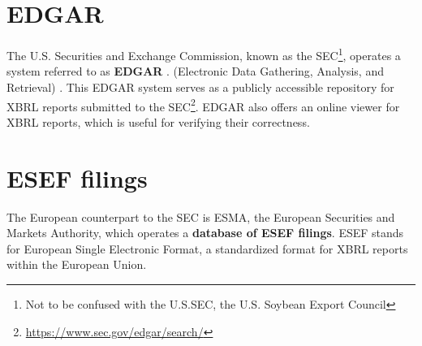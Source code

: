 \section{EDGAR}
\label{sec:edgar}
The U.S. Securities and Exchange Commission, known as the SEC\footnote{Not to be confused with the U.S.SEC, the U.S. Soybean Export Council},
operates a system referred to as 
\textcolor{tropicalrainforest}{\textbf{EDGAR}} \cite{sec_edgar}. 
(Electronic Data Gathering, Analysis, and Retrieval) \cite{sec_edgar}. 
This EDGAR system serves as a publicly accessible repository for XBRL reports submitted to the SEC\footnote{\url{https://www.sec.gov/edgar/search/}}.
EDGAR also offers an online viewer for XBRL reports,
which is useful for verifying their correctness.

\section{ESEF filings}
The European counterpart to the SEC is ESMA, 
the European Securities and Markets Authority, 
which operates a 
\textcolor{tropicalrainforest}{\textbf{database of ESEF filings}}\cite{esma_database}. 
ESEF stands for European Single Electronic Format, 
a standardized format for XBRL reports within the European Union.

